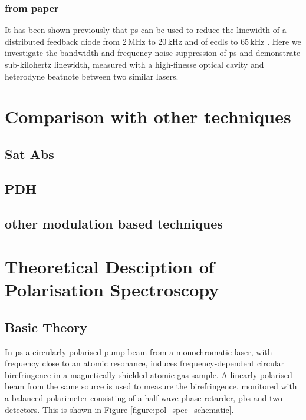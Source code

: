 \subsubsection{from paper}
It has been shown previously that \gls*{ps} can be used to reduce the linewidth of a distributed feedback diode from 2\,MHz to 20\,kHz \cite{torii_laser-phase_2012} and of \glspl*{ecdl} to 65\,kHz \cite{yoshikawa_frequency_2003}.
Here we investigate the bandwidth and frequency noise suppression of \gls*{ps} and demonstrate sub-kilohertz linewidth, measured with a high-finesse optical cavity and heterodyne beatnote between two similar lasers.

\section{Comparison with other techniques}
\subsection{Sat Abs}
\subsection{PDH}
\subsection{other modulation based techniques}
\section{Theoretical Desciption of Polarisation Spectroscopy}\label{section:pol_spec_theory}
\subsection{Basic Theory}

In \gls{ps} a circularly polarised pump beam from a monochromatic laser, with frequency close to an atomic resonance, induces frequency-dependent circular birefringence in a magnetically-shielded atomic gas sample.
A linearly polarised beam from the same source is used to measure the birefringence, monitored with a balanced polarimeter consisting of a half-wave phase retarder, \gls{pbs} and two detectors.
This is shown in Figure \ref{figure:pol_spec_schematic}.

